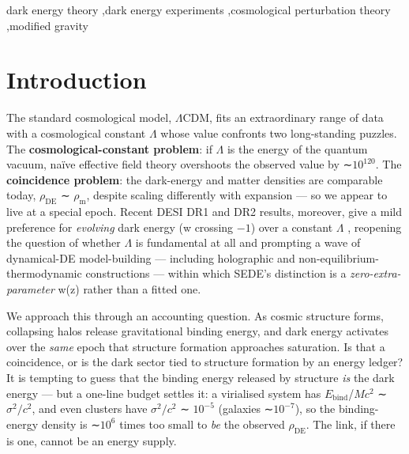 \documentclass[preprint,12pt]{elsarticle}
\begin{document}
\begin{frontmatter}
\begin{keyword}
dark energy theory \sep dark energy experiments \sep cosmological perturbation
theory \sep modified gravity
\end{keyword}

\end{frontmatter}

\section{Introduction}\label{sec-1}

The standard cosmological model, \(\Lambda \mathrm{CDM}\), fits an
extraordinary range of data with a cosmological constant \(\Lambda\)
whose value confronts two long-standing puzzles. The
\textbf{cosmological-constant problem}: if \(\Lambda\) is the energy of
the quantum vacuum, naïve effective field theory overshoots the observed
value by ∼\(10^{120}\). The \textbf{coincidence problem}: the
dark-energy and matter densities are comparable today,
\(\rho _\mathrm{DE}\) ∼ \(\rho _{\mathrm{m}}\), despite scaling
differently with expansion --- so we appear to live at a special epoch.
Recent DESI DR1 and DR2 results, moreover, give a mild preference for
\emph{evolving} dark energy (w crossing \(-1\)) over a constant
\(\Lambda\) \citep{DESI:2024mwx, DESI:2024kob, DESI:2025fii}, reopening
the question of whether \(\Lambda\) is fundamental at all and prompting
a wave of dynamical-DE model-building --- including holographic and
non-equilibrium-thermodynamic constructions
\citep{Li:2024qus, Bhattacharjee:2025xeb} --- within which SEDE's
distinction is a \emph{zero-extra-parameter} w(z) rather than a fitted
one.

We approach this through an accounting question. As cosmic structure
forms, collapsing halos release gravitational binding energy, and dark
energy activates over the \emph{same} epoch that structure formation
approaches saturation. Is that a coincidence, or is the dark sector tied
to structure formation by an energy ledger? It is tempting to guess that
the binding energy released by structure \emph{is} the dark energy ---
but a one-line budget settles it: a virialised system has
\textbar{}\(E_{\mathrm{bind}}\)\textbar/\(Mc^{2}\) ∼
\(\sigma ^{2}/c^{2}\), and even clusters have \(\sigma ^{2}/c^{2}\) ∼
\(10^{-5}\) (galaxies ∼\(10^{-7}\)), so the binding-energy density is
∼\(10^{6}\) times too small to \emph{be} the observed
\(\rho _\mathrm{DE}\). The link, if there is one, cannot be an energy
supply.
\end{document}
